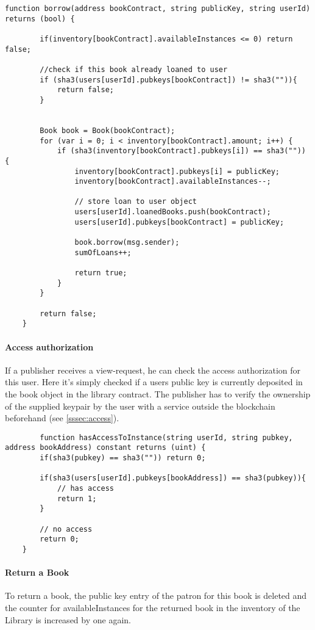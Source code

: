 \begin{lstlisting}
function borrow(address bookContract, string publicKey, string userId) returns (bool) {

		if(inventory[bookContract].availableInstances <= 0) return false;

		//check if this book already loaned to user
        if (sha3(users[userId].pubkeys[bookContract]) != sha3("")){
            return false;
        }


		Book book = Book(bookContract);
        for (var i = 0; i < inventory[bookContract].amount; i++) {
            if (sha3(inventory[bookContract].pubkeys[i]) == sha3("")) {
                inventory[bookContract].pubkeys[i] = publicKey;
                inventory[bookContract].availableInstances--;

                // store loan to user object
                users[userId].loanedBooks.push(bookContract);
                users[userId].pubkeys[bookContract] = publicKey;

                book.borrow(msg.sender);
                sumOfLoans++;

                return true;
            }
        }

        return false;
	}
\end{lstlisting}

\paragraph*{Access authorization \label{sssec:contractaccess}}
If a publisher receives a view-request, he can check the access authorization for this user. Here it's simply checked if a users public key is currently deposited in the book object in the library contract.
The publisher has to verify the ownership of the supplied keypair by the user with a service outside the blockchain beforehand  (see \ref{sssec:access}). 

\begin{lstlisting}
	    function hasAccessToInstance(string userId, string pubkey, address bookAddress) constant returns (uint) {
        if(sha3(pubkey) == sha3("")) return 0;

        if(sha3(users[userId].pubkeys[bookAddress]) == sha3(pubkey)){
            // has access
            return 1;
        }

        // no access
        return 0;
    }
\end{lstlisting}


\paragraph*{Return a Book}
To return a book, the public key entry of the patron for this book is deleted and the counter for availableInstances for the returned book in the inventory of the Library is increased by one again.

